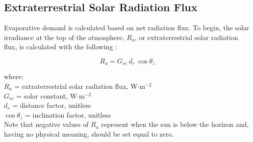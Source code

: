 \subsection{Extraterrestrial Solar Radiation Flux}
\label{sec:ra}
Evaporative demand is calculated based on net radiation flux. 
To begin, the solar irradiance at the top of the atmosphere, $R_a$, or extraterrestrial solar radiation flux, is calculated with the following \parencite[Eq.~1.10.2]{duffie13}:

%
\begin{equation}
\label{eq:etsr}
    R_{a} = G_{sc} \: d_{r} \: \cos \theta_z
\end{equation}

\noindent where: \\
\indent $R_{a}$ = extraterrestrial solar radiation flux, W$\cdot$m$^{-2}$ \\
\indent $G_{sc}$ = solar constant, W$\cdot$m$^{-2}$ \\
\indent $d_{r}$ = distance factor, unitless \\
\indent $\cos \theta_z$ = inclination factor, unitless \\

\noindent Note that negative values of $R_a$ represent when the sun is below the horizon and, having no physical meaning, should be set equal to zero.

